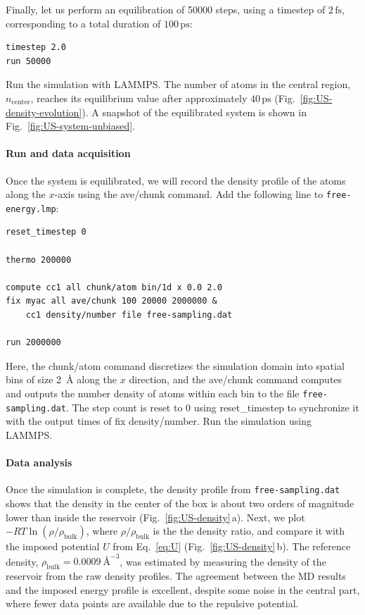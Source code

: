 \documentclass[9pt,tutorial]{livecoms}
\newcommand{\lmpcmd}[1]{\colorbox{listing}{\textcolor{command}{\small{#1}}}} %
\newcommand{\flecmd}[1]{\textcolor{command}{\texttt{#1}}} %
\begin{document}
Finally, let us perform an equilibration of 50000 steps,
using a timestep of $2\,\text{fs}$, corresponding to a total duration of $100\,\text{ps}$:
\begin{lstlisting}
timestep 2.0
run 50000
\end{lstlisting}
Run the simulation with LAMMPS.  The number of atoms in the
central region, $n_\mathrm{center}$, reaches its equilibrium value after approximately $40\,\text{ps}$
(Fig.~\ref{fig:US-density-evolution}).  A snapshot of the equilibrated system is shown in Fig.~\ref{fig:US-system-unbiased}.

\paragraph{Run and data acquisition}

Once the system is equilibrated, we will record the density profile of
the atoms along the $x$-axis using the \lmpcmd{ave/chunk} command.
Add the following line to \flecmd{free-energy.lmp}:
\begin{lstlisting}
reset_timestep 0

thermo 200000

compute cc1 all chunk/atom bin/1d x 0.0 2.0
fix myac all ave/chunk 100 20000 2000000 &
    cc1 density/number file free-sampling.dat

run 2000000
\end{lstlisting}
{\color{blue}Here, the \lmpcmd{chunk/atom} command discretizes the simulation
domain into spatial bins of size 2~\AA{} along the $x$ direction,
and the \lmpcmd{ave/chunk} command computes and outputs the number density of
atoms within each bin to the file \flecmd{free-sampling.dat}.}
The step count is reset to 0 using \lmpcmd{reset\_timestep} to synchronize it
with the output times of \lmpcmd{fix density/number}.  Run the simulation using
LAMMPS.

\paragraph{Data analysis}

Once the simulation is complete, the density profile from \flecmd{free-sampling.dat}
shows that the density in the center of the box is
about two orders of magnitude lower than inside the reservoir (Fig.~\ref{fig:US-density}\,a).
Next, we plot $-R T \ln(\rho/\rho_\mathrm{bulk})$, %
{\color{blue} where $\rho/\rho_\mathrm{bulk}$ is the the density ratio,}
and compare it
with the imposed potential $U$ from Eq.~\eqref{eq:U} (Fig.~\ref{fig:US-density}\,b).
The reference density, $\rho_\text{bulk} = 0.0009~\text{\AA{}}^{-3}$,
was estimated by measuring the density of the reservoir from the raw density
profiles.  The agreement between the MD results and the imposed energy profile
is excellent, despite some noise in the central part, where fewer data points
are available due to the repulsive potential.
\end{document}
